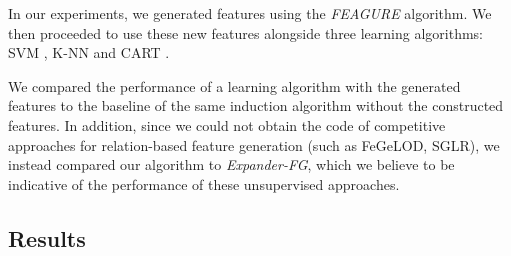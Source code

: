 \documentclass[letterpaper]{article} %
\theoremstyle{definition}
\begin{document}
In our experiments, we generated features using the \emph{FEAGURE} algorithm. We then proceeded to use these new features alongside three learning algorithms: SVM \cite{cortes1995support}, K-NN \cite{fix1951discriminatory} and CART \cite{breiman1984classification}.

We compared the performance of a learning algorithm with the generated features to the baseline of the same induction algorithm without the constructed features.
In addition, since we could not obtain the code of competitive approaches for relation-based feature generation (such as FeGeLOD, SGLR), we instead compared our algorithm to \emph{Expander-FG}, which we believe to be indicative of the performance of these unsupervised approaches.






\subsection{Results}
\end{document}

